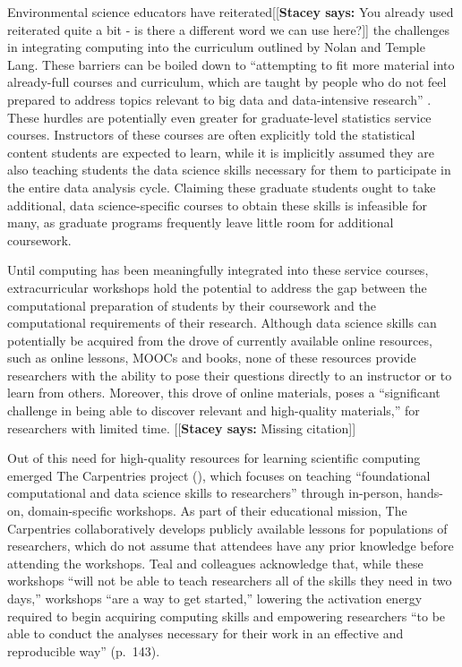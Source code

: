 \documentclass[12pt]{article}
\newcommand{\stacey}[1]{{\color{purple}[[\textbf{Stacey says: }#1]]}}
\begin{document}
\quad Environmental science educators have reiterated\stacey{You already used reiterated
quite a bit - is there a different word we can use here?} the challenges in 
integrating computing into the curriculum outlined by Nolan and Temple Lang. 
These barriers can be boiled down to ``attempting to fit more material into
already-full courses and curriculum, which are taught by people who do not feel
prepared to address topics relevant to big data and data-intensive research'' 
\citep[p.\ 547]{hampton}. These hurdles are potentially even greater for 
graduate-level statistics service courses. Instructors of these courses are 
often explicitly told the statistical content students are expected to learn, 
while it is implicitly assumed they are also teaching students the data science
skills necessary for them to participate in the entire data analysis cycle.
Claiming these graduate students ought to take additional, data science-specific
courses to obtain these skills is infeasible for many, as graduate programs
frequently leave little room for additional coursework. 

\quad Until computing has been meaningfully integrated into these service 
courses, extracurricular workshops hold the potential to address the gap between
the computational preparation of students by their coursework and the 
computational requirements of their research. Although data science skills can 
potentially be acquired from the drove of currently available online resources, 
such as online lessons, MOOCs and books, none of these resources provide
researchers with the ability to pose their questions directly to an instructor
or to learn from others. Moreover, this drove of online materials, poses a  
``significant challenge in being able to discover relevant and high-quality
materials,'' for researchers with limited time. \stacey{Missing citation}

\quad Out of this need for high-quality
resources for learning scientific computing emerged The Carpentries project
(\citeyear{carpentries}), which focuses on teaching ``foundational
computational and data science skills to researchers'' through in-person,
hands-on, domain-specific workshops. As part of their educational mission,
The Carpentries collaboratively develops publicly available lessons for
populations of researchers, which do not assume that attendees have any prior
knowledge before attending the workshops. Teal and colleagues acknowledge that,
while these workshops ``will not be able to teach researchers all of the skills
they need in two days,'' workshops ``are a way to get started,'' lowering the
activation energy required to begin acquiring computing skills and empowering
researchers ``to be able to conduct the analyses necessary for their work in an
effective and reproducible way'' (p.\ 143). 
\end{document}
